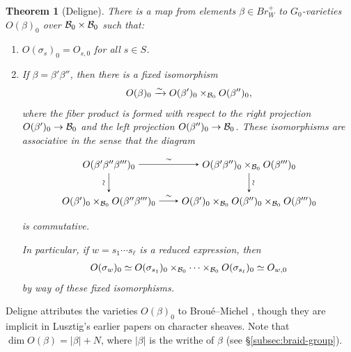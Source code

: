 \documentclass[a4paper,10pt,leqno]{amsart}
\theoremstyle{plain}
\theoremstyle{plain}
\newtheorem{thm}{Theorem}[subsection]
\theoremstyle{plain}
\theoremstyle{definition}
\theoremstyle{remark}
\newcommand{\Br}{\mathit{Br}}
\begin{document}
\begin{thm}[Deligne]
There is a map from elements $\beta \in \Br_W^+$ to $G_0$-varieties $O(\beta)_0$ over $\cal{B}_0 \times \cal{B}_0$ such that:
\begin{enumerate}
\item 	$O(\sigma_s)_0 = O_{s, 0}$ for all $s \in S$.
\item 	If $\beta = \beta'\beta''$, then there is a fixed isomorphism 
\begin{align}
O(\beta)_0 \xrightarrow{\sim} O(\beta')_0 \times_{\cal{B}_0} O(\beta'')_0,
\end{align}
where the fiber product is formed with respect to the right projection $O(\beta')_0 \to \cal{B}_0$ and the left projection $O(\beta'')_0 \to \cal{B}_0$.
		These isomorphisms are associative in the sense that the diagram
		\begin{equation}
\begin{tikzpicture}[baseline=(current bounding box.center), >=stealth]
\matrix(m)[matrix of math nodes, row sep=2em, column sep=2em, text height=2ex, text depth=0.5ex]
{	O(\beta'\beta''\beta''')_0
		&O(\beta'\beta'')_0 \times_{\cal{B}_0} O(\beta''')_0\\
	O(\beta')_0 \times_{\cal{B}_0} O(\beta''\beta''')_0
		&O(\beta')_0 \times_{\cal{B}_0} O(\beta'')_0 \times_{\cal{B}_0} O(\beta''')_0\\
		};
\path[->,font=\scriptsize, auto]
(m-1-1)		edge node{$\sim$} (m-1-2)
			edge node[rotate=90,above]{$\sim$} (m-2-1)
(m-1-2)		edge node[rotate=90,below]{$\sim$} (m-2-2)
(m-2-1)		edge node{$\sim$} (m-2-2);
\end{tikzpicture}
\end{equation}
is commutative.

In particular, if $w = s_1 \cdots s_\ell$ is a reduced expression, then 
\begin{align}
O(\sigma_w)_0 
\simeq O(\sigma_{s_1})_0 \times_{\cal{B}_0} \cdots \times_{\cal{B}_0} O(\sigma_{s_\ell})_0
\simeq O_{w, 0}
\end{align}
by way of these fixed isomorphisms.
\end{enumerate}
\end{thm}

Deligne attributes the varieties $O(\beta)_0$ to Brou\'e--Michel \cite{bm_1997}, though they are implicit in Lusztig's earlier papers on character sheaves.
Note that $\dim O(\beta) = |\beta| + N$, where $|\beta|$ is the writhe of $\beta$ (see \S\ref{subsec:braid-group}).
\end{document}
